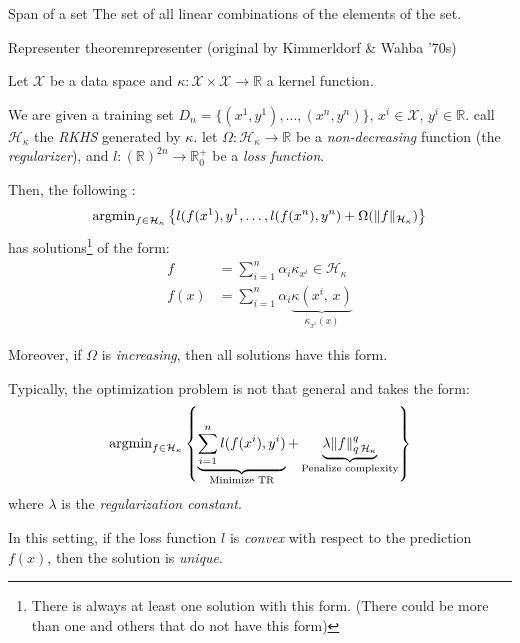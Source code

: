 \begin{definition}{Span of a set}{}
	The set of all linear combinations of the elements of the set.
\end{definition}


\begin{theorem}{Representer theorem}{representer}
	(original by Kimmerldorf \& Wahba '70s)

	Let $\mathcal X$ be a data space and
	$\kappa : \mathcal X \times \mathcal X \to \mathds R$ a kernel function.

	We are given a training set $D_n =\{(x^1, y^1), \dots, (x^n, y^n)\},\,
		x^i \in \mathcal X,\, y^i \in \mathds R$.
	call $\mathcal H_\kappa$ the \emph{RKHS} generated by $\kappa$.
	let $\Omega: \mathcal H_\kappa \to \mathds R$ be a \emph{non-decreasing}
	function (the \emph{regularizer}), and
	$l: (\mathds R)^{2n} \to \mathds R^+_0$ be a \emph{loss function}.

	Then, the following :
	\begin{align*}
		\operatorname{argmin}_{f \in \mathcal H_\kappa}
		\left\{
		l(f(x^1), y^1 , \ldots , l(f(x^n), y^n) + \Omega(\lVert f \rVert_{\mathcal H_\kappa})
		\right\}
	\end{align*}
	has solutions\footnote{There is always at least one solution with this form. (There could be more than one and others that do not have this form)} of the form:
	\begin{align*}
		f    & = \sum_{i=1}^n \alpha_i \kappa_{x^i} \in \mathcal H_\kappa \\
		f(x) & = \sum_{i=1}^n \alpha_i
		\underbrace{\kappa(x^i,\, x)}_{\kappa_{x^i}(x)}
	\end{align*}

	Moreover, if $\Omega$ is \emph{increasing}, then all solutions have
	this form.

	\begin{note}
		Typically, the optimization problem is not that general and takes
		the form:
		\begin{equation*}
			\operatorname{argmin}_{f \in \mathcal H_\kappa} \left\{
			\underbrace{\sum_{i=1}^n l(f(x^i), y^i)}_{\text{Minimize TR}} +
			\underbrace{\lambda \lVert f \rVert_{q\,\mathcal H_\kappa}^q}_{\text{Penalize complexity}}
			\right\}
		\end{equation*}
		where $\lambda$ is the \emph{regularization constant}.

		\tcbline

		In this setting, if the loss function $l$ is \emph{convex}
		with respect to the prediction $f(x)$, then the solution is
		\emph{unique}.
	\end{note}

\end{theorem}

